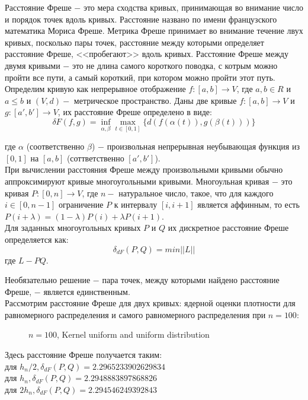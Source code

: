 \documentclass[report.tex]{subfiles}
\begin{document}
Расстояние Фреше $-$ это мера сходства кривых, принимающая во внимание число и порядок точек вдоль кривых. Расстояние названо по имени французского математика Мориса Фреше.
Метрика Фреше принимает во внимание течение лвух кривых, посколько пары точек, расстояние между которыми определяет расстояние Фреше, <<пробегают>> вдоль кривых.
Расстояние Фреше между двумя кривыми $-$ это не длина самого короткого поводка, с котрым можно пройти все пути, а самый короткий, при котором можно пройти этот путь. \\

Определим кривую как непрерывное отображение $f: [a,b] \rightarrow V$, где $a, b \in R$ и $a \leq b$ и $(V,d) - $ метрическое пространство.
Даны две кривые $f: [a,b] \rightarrow V$ и $g: [a',b'] \rightarrow V$, их расстояние Фреше определено в виде:
\begin{equation}
    \delta F(f,g) = \inf_{\alpha, \beta}\max_{t \in [0,1]}{\{d(f(\alpha(t)), g(\beta(t)))\}}
\end{equation}

где $\alpha$ (соответственно $\beta$) $-$ произвольная непрерывная неубывающая функция из $[0, 1]$ на $[a, b]$ (соттветственно $[a',b']$). \\
При вычислении расстояния Фреше между произвольными кривыми обычно аппроксимируют кривые многоугольными кривыми. Многоульная кривая $-$ это кривая $P: [0,n] \rightarrow V$, где $n - $ натуральное число, такое, что для каждого $i \in [0,n-1]$ ограничение $P$ к интервалу $[i,i+1]$ является аффинным, то есть $P(i+\lambda) = (1-\lambda)P(i)+\lambda P(i+1)$. \\
Для заданных многоугольных кривых $P$ и $Q$ их дискретное расстояние Фреше определяется как:
\begin{equation}
    \delta_{dF}(P,Q)=min || L ||
\end{equation}
где $L - PQ$.

Необязательно решение $ - $ пара точек, между которыми найдено расстояние Фреше, $-$ является единственным. \\

Рассмотрим расстояние Фреше для двух кривых: ядерной оценки плотности для равномерного распределения и самого равномерного распределения при $n=100$:

\begin{figure}[ht]
	\centering
	\caption{$n = 100$, Kernel uniform and uniform distribution}
	\label{Frechet_dist}
\end{figure}
Здесь расстояние Фреше получается таким:\\
для $h_n/2, \delta_{dF}(P,Q) = 2.2965233902629834$ \\
для $h_n, \delta_{dF}(P,Q) = 2.2948883897868826$ \\
для $2h_n, \delta_{dF}(P,Q) = 2.294546249392843$ \\
\end{document}

